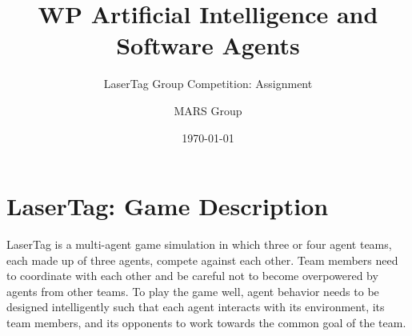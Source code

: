 \documentclass[
    a4paper,
    english,
    DIV=16,
    11pt,
    parskip=half,
]{scrartcl}
\title{WP Artificial Intelligence and Software Agents}
\subtitle{LaserTag Group Competition: Assignment}
\author{MARS Group}
\date{\today}
\begin{document}
\maketitle
\section*{LaserTag: Game Description}
LaserTag is a multi-agent game simulation in which three or four agent teams, each made up of three agents, compete against each other. Team members need to coordinate with each other and be careful not to become overpowered by agents from other teams. To play the game well, agent behavior needs to be designed intelligently such that each agent interacts with its environment, its team members, and its opponents to work towards the common goal of the team.
\end{document}
